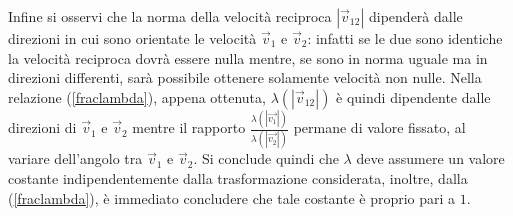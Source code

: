 Infine si osservi che la norma della velocità reciproca $|\vec{v}_{12}|$ dipenderà dalle direzioni in cui sono orientate le velocità $\vec{v}_1$ e $\vec{v}_2$: infatti se le due sono identiche la velocità reciproca dovrà essere nulla mentre, se sono in norma uguale ma in direzioni differenti, sarà possibile ottenere solamente velocità non nulle. Nella relazione (\ref{fraclambda}), appena ottenuta, $\lambda(|\vec{v}_{12}|)$ è quindi dipendente dalle direzioni di $\vec{v}_1$ e $\vec{v}_2$ mentre il rapporto $\frac{\lambda(|\vec{v_1}|)}{\lambda(|\vec{v_2}|)}$ permane di valore fissato, al variare dell'angolo tra $\vec{v}_1$ e $\vec{v}_2$. Si conclude quindi che $\lambda$ deve assumere un valore costante indipendentemente dalla trasformazione considerata, inoltre, dalla (\ref{fraclambda}), è immediato concludere che tale costante è proprio pari a $1$.\\

